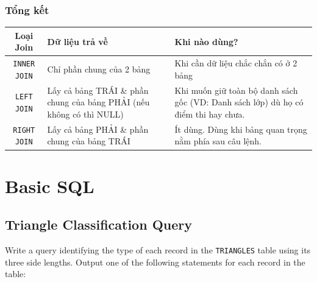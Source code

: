 \documentclass[12pt,a4paper]{article}
\renewcommand{\arraystretch}{1.5} %
\begin{document}
\subsubsection{Tổng kết}
\begin{table}[H]
\centering
\renewcommand{\arraystretch}{1.3}
\begin{tabularx}{\textwidth}{|c|X|X|}
\hline
\textbf{Loại Join} & \textbf{Dữ liệu trả về} & \textbf{Khi nào dùng?} \\ \hline
\texttt{INNER JOIN} & Chỉ phần chung của 2 bảng &  Khi cần dữ liệu chắc chắn có ở 2 bảng\\ \hline
\texttt{LEFT JOIN} & Lấy cả bảng TRÁI \& phần chung của bảng PHẢI (nếu không có thì NULL)& Khi muốn giữ toàn bộ danh sách gốc (VD: Danh sách lớp) dù họ có điểm thi hay chưa.\\ \hline
\texttt{RIGHT JOIN} & Lấy cả bảng PHẢI \& phần chung của bảng TRÁI& Ít dùng. Dùng khi bảng quan trọng nằm phía sau câu lệnh.\\ \hline
\end{tabularx}
\end{table}

\section{Basic SQL}
\subsection{Triangle Classification Query}
Write a query identifying the type of each record in the \texttt{TRIANGLES} table using its three side lengths.  
Output one of the following statements for each record in the table:
\end{document}

